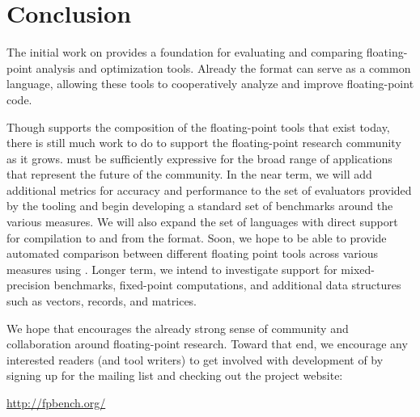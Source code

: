 \documentclass[main.tex]{subfiles}
\begin{document}
\section{Conclusion}
\label{sec:conclusion}

The initial work on \name provides a
foundation for evaluating and comparing floating-point analysis and
optimization tools.  Already the \name format can serve as a
common language, allowing these tools to
cooperatively analyze and improve floating-point code.

Though \name supports the composition
  of the floating-point tools that exist today,
  there is still much work to do to support
  the floating-point research community as it grows.
\name must be sufficiently expressive for the broad range of applications
  that represent the future of the community.
In the near term, we will add additional
metrics for accuracy and performance to the set of evaluators provided by
the \name tooling and begin developing a standard set of benchmarks
around the various measures. We will also expand the set of languages with
direct support for compilation to and from the \name format.
Soon, we hope to be able to provide automated comparison
between different floating point tools across various measures
using \name.
Longer term, we intend to investigate support for mixed-precision benchmarks,
fixed-point computations, and additional data structures such as
vectors, records, and matrices.

We hope that \name encourages the already strong sense of community
and collaboration around floating-point research.  Toward that end, we
encourage any interested readers (and tool writers)
to get involved with development of \name
by signing up for the mailing list and checking out the project
website:

\begin{center}
\huge\url{http://fpbench.org/}
\end{center}
\end{document}
